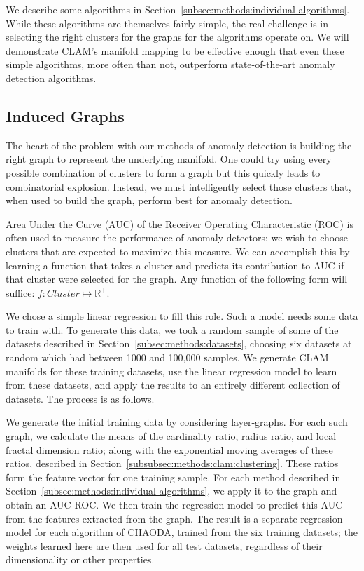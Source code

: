 We describe some algorithms in Section~\ref{subsec:methods:individual-algorithms}.
While these algorithms are themselves fairly simple, the real challenge is in selecting the right clusters for the graphs for the algorithms operate on.
We will demonstrate CLAM's manifold mapping to be effective enough that even these simple algorithms, more often than not, outperform state-of-the-art anomaly detection algorithms.

\subsection{Induced Graphs}
\label{subsec:methods:induced-graphs}
The heart of the problem with our methods of anomaly detection is building the right graph to represent the underlying manifold.
One could try using every possible combination of clusters to form a graph but this quickly leads to combinatorial explosion.
Instead, we must intelligently select those clusters that, when used to build the graph, perform best for anomaly detection.

Area Under the Curve (AUC) of the Receiver Operating Characteristic (ROC) is often used to measure the performance of anomaly detectors;
we wish to choose clusters that are expected to maximize this measure.
We can accomplish this by learning a function that takes a cluster and predicts its contribution to AUC if that cluster were selected for the graph.
Any function of the following form will suffice: $f: Cluster \mapsto \mathbb{R}^+$.


We chose a simple linear regression to fill this role.
Such a model needs some data to train with.
To generate this data, we took a random sample of some of the datasets described in Section~\ref{subsec:methods:datasets}, choosing six datasets at random which had between 1000 and 100,000 samples.
We generate CLAM manifolds for these training datasets, use the linear regression model to learn from these datasets, and apply the results to an entirely different collection of datasets. The process is as follows.

We generate the initial training data by considering layer-graphs.
For each such graph, we calculate the means of the cardinality ratio, radius ratio, and local fractal dimension ratio;
along with the exponential moving averages of these ratios, described in Section~\ref{subsubsec:methods:clam:clustering}.
These ratios form the feature vector for one training sample.
For each method described in Section~\ref{subsec:methods:individual-algorithms}, we apply it to the graph and obtain an AUC ROC\@.
We then train the regression model to predict this AUC from the features extracted from the graph.
The result is a separate regression model for each algorithm of CHAODA, trained from the six training datasets; the weights learned here are then used for all test datasets, regardless of their dimensionality or other properties.


